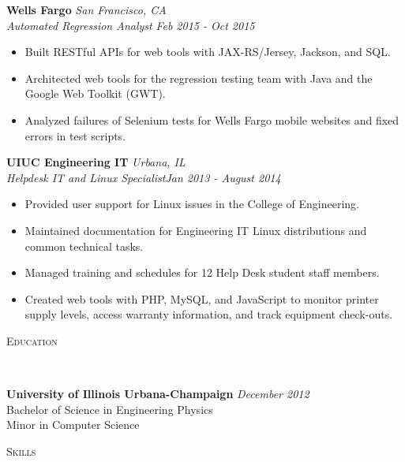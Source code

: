 \documentclass{article}
\newenvironment{changemargin}[2]{%
  \begin{list}{}{%
    \setlength{\topsep}{0pt}%
    \setlength{\leftmargin}{#1}%
    \setlength{\rightmargin}{#2}%
    \setlength{\listparindent}{\parindent}%
    \setlength{\itemindent}{\parindent}%
    \setlength{\parsep}{\parskip}%
  }%
  \item[]}{\end{list}
}
\newcommand{\lineover}{
	\begin{changemargin}{-0.05in}{-0.05in}
		\vspace*{-8pt}
		\hrulefill \\
		\vspace*{-2pt}
	\end{changemargin}
}
\newcommand{\header}[1]{
	\begin{changemargin}{-0.5in}{-0.5in}
		\scshape{#1}\\
  	\lineover
	\end{changemargin}
}
\newenvironment{body} {
	\vspace*{-16pt}
	\begin{changemargin}{-0.25in}{-0.5in}
  }	
	{\end{changemargin}
}
\begin{document}
\begin{body}
	\textbf{Wells Fargo} \hfill \emph{San Francisco, CA}\\
	\emph{Automated Regression Analyst} \hfill \emph{Feb 2015 - Oct 2015}\\
	\begin{itemize} \itemsep -0pt  %
		\item Built RESTful APIs for web tools with JAX-RS/Jersey, Jackson, and SQL.
		\item Architected web tools for the regression testing team with Java and the Google Web Toolkit (GWT).
		\item Analyzed failures of Selenium tests for Wells Fargo mobile websites and fixed errors in test scripts.	
	\end{itemize}

	\textbf{UIUC Engineering IT} \hfill \emph{Urbana, IL}\\
	\emph{Helpdesk IT and Linux Specialist}\hfill \emph{Jan 2013 - August 2014}\\

	\begin{itemize} \itemsep -0pt  %
		\item Provided user support for Linux issues in the College of Engineering.
		\item Maintained documentation for Engineering IT Linux distributions and common technical tasks.
		\item Managed training and schedules for 12 Help Desk student staff members.
		\item Created web tools with PHP, MySQL, and JavaScript to monitor printer supply levels, access warranty information, and track equipment check-outs.
	\end{itemize}

\end{body}

\header{Education}
\vspace{14pt}
\begin{body}

	\textbf{University of Illinois Urbana-Champaign} \hfill \emph{December 2012}{} \\
	\hspace{4ex} Bachelor of Science in Engineering Physics \\
	\hspace{4ex} Minor in Computer Science\\
\end{body}

\header{Skills}
\end{document}
